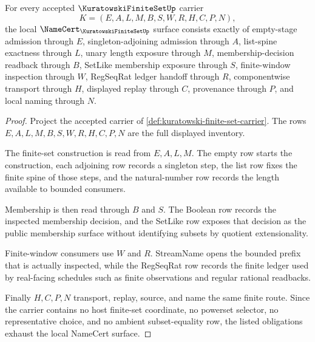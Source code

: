 \begin{theorem}
\label{thm:kuratowski-finite-set-namecert-obligations}
For every accepted $\KuratowskiFiniteSetUp$ carrier
$$
K=(E,A,L,M,B,S,W,R,H,C,P,N),
$$
the local $\NameCert_{\KuratowskiFiniteSetUp}$ surface consists exactly of empty-stage admission through $E$, singleton-adjoining admission through $A$, list-spine exactness through $L$, unary length exposure through $M$, membership-decision readback through $B$, SetLike membership exposure through $S$, finite-window inspection through $W$, RegSeqRat ledger handoff through $R$, componentwise transport through $H$, displayed replay through $C$, provenance through $P$, and local naming through $N$.
\end{theorem}
\begin{proof}
Project the accepted carrier of \autoref{def:kuratowski-finite-set-carrier}. The rows $E,A,L,M,B,S,W,R,H,C,P,N$ are the full displayed inventory.

The finite-set construction is read from $E,A,L,M$. The empty row starts the construction, each adjoining row records a singleton step, the list row fixes the finite spine of those steps, and the natural-number row records the length available to bounded consumers.

Membership is then read through $B$ and $S$. The Boolean row records the inspected membership decision, and the SetLike row exposes that decision as the public membership surface without identifying subsets by quotient extensionality.

Finite-window consumers use $W$ and $R$. StreamName opens the bounded prefix that is actually inspected, while the RegSeqRat row records the finite ledger used by real-facing schedules such as finite observations and regular rational readbacks.

Finally $H,C,P,N$ transport, replay, source, and name the same finite route. Since the carrier contains no host finite-set coordinate, no powerset selector, no representative choice, and no ambient subset-equality row, the listed obligations exhaust the local NameCert surface.
\end{proof}


